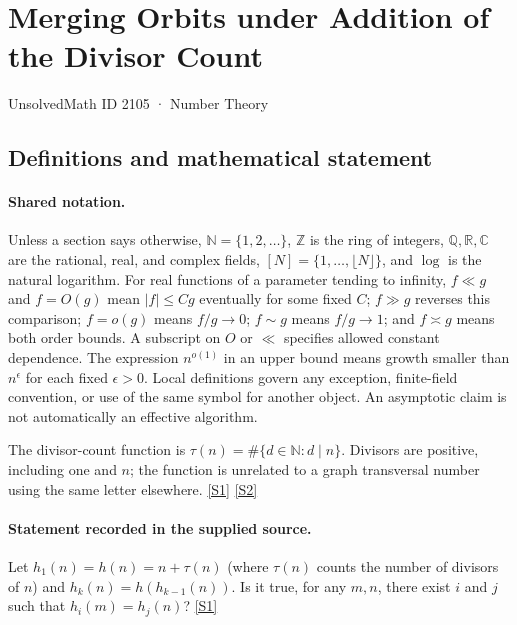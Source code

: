 \documentclass[11pt,a4paper]{article}
\newcommand{\N}{\mathbb{N}}
\newcommand{\Z}{\mathbb{Z}}
\newcommand{\Q}{\mathbb{Q}}
\newcommand{\R}{\mathbb{R}}
\newcommand{\C}{\mathbb{C}}
\newcommand{\sref}[2]{\hyperlink{source:#1:#2}{[S#2]}}
\begin{document}

\setcounter{section}{2104}

\section{Merging Orbits under Addition of the Divisor Count}\label{2105}

{\small\sffamily UnsolvedMath ID 2105 · Number Theory}

\subsection{Definitions and mathematical statement}

\paragraph{Shared notation.}Unless a section says otherwise, $\N=\{1,2,\ldots\}$,
$\Z$ is the ring of integers, $\Q,\R,\C$ are the rational, real, and complex
fields, $[N]=\{1,\ldots,\lfloor N\rfloor\}$, and $\log$ is the natural
logarithm. For real functions of a parameter tending to infinity,
$f\ll g$ and $f=O(g)$ mean $|f|\leq Cg$ eventually for some fixed $C$;
$f\gg g$ reverses this comparison; $f=o(g)$ means $f/g\to0$;
$f\sim g$ means $f/g\to1$; and $f\asymp g$ means both order bounds.
A subscript on $O$ or $\ll$ specifies allowed constant dependence.
The expression $n^{o(1)}$ in an upper bound means growth smaller than
$n^\epsilon$ for each fixed $\epsilon>0$. Local definitions govern any
exception, finite-field convention, or use of the same symbol for another
object. An asymptotic claim is not automatically an effective algorithm.



The divisor-count function is $\tau(n)=\#\{d\in\N:d\mid n\}$. Divisors are positive, including one and $n$; the function is unrelated to a graph transversal number using the same letter elsewhere. \sref{2105}{1} \sref{2105}{2}

\paragraph{Statement recorded in the supplied source.}
Let $h_1(n)=h(n)=n+\tau(n)$ (where $\tau(n)$ counts the number of divisors of $n$) and $h_k(n)=h(h_{k-1}(n))$. Is it true, for any $m,n$, there exist $i$ and $j$ such that $h_i(m)=h_j(n)$? \sref{2105}{1}
\end{document}
